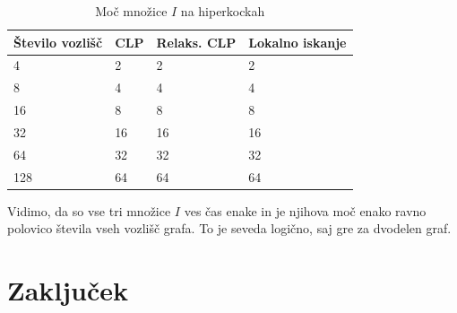 \documentclass[a4paper, 12 pt]{article}
\theoremstyle{definition}
\theoremstyle{plain}
\theoremstyle{remark}
\begin{document}
\begin{table}[H]
\centering
\begin{tabular}{|p{3cm}|p{1cm}|p{2.7cm}|p{3.2cm}|}
\hline
\textbf{Število vozlišč}  & \textbf{CLP} & \textbf{Relaks. CLP} & \textbf{Lokalno iskanje} \\ \hline
4     & 2 &2  &2  \\ \hline
8     & 4 & 4 &4  \\ \hline
16   & 8 & 8  &8  \\ \hline
32   & 16 &16  &16  \\ \hline
64   & 32 & 32 &  32 \\ \hline
128 & 64 & 64 & 64  \\ \hline
\end{tabular}
\caption{Moč množice $I$ na hiperkockah}
\label{fig:hipekocka I} 
\end{table}
Vidimo, da so vse tri množice $I$ ves čas enake in je njihova moč enako ravno polovico števila vseh vozlišč grafa. To je seveda logično, saj gre za dvodelen graf. 


\section{Zaključek}


\end{document}
